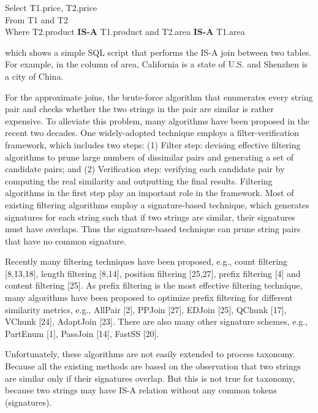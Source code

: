 \vspace{2mm}

\noindent \textsf{Select T1.price, T2.price} \\
\noindent \textsf{ From T1 and T2} \\
\noindent   \textsf{Where T2.product \textbf{IS-A} T1.product and T2.area \textbf{IS-A} T1.area}

 \vspace{2mm}


\noindent which shows a simple SQL script that
performs the IS-A join between two tables. For example, in the column of area, California is a state of U.S. and Shenzhen is a city of China.

For the approximate joins, the brute-force algorithm that enumerates every string pair and checks whether the two strings in the pair are similar is rather expensive. To alleviate this problem, many algorithms have been proposed in the recent two decades. One widely-adopted technique employs a filter-verification framework, which includes two steps: (1) Filter step: devising effective filtering algorithms to prune large numbers of dissimilar pairs and generating a set of candidate pairs; and (2) Verification step: verifying each candidate pair by computing
the real similarity and outputting the final results. Filtering algorithms in the first step play an important role
in the framework. Most of existing filtering algorithms employ a signature-based technique, which generates signatures for each string such that if two strings are similar, their signatures must have overlaps. Thus the signature-based technique can prune string pairs that have no common signature.

Recently many filtering techniques have been proposed, e.g., count filtering [8,13,18], length filtering [8,14], position
filtering [25,27], prefix filtering [4] and content filtering [25]. As prefix filtering is the most effective filtering technique,
many algorithms have been proposed to optimize prefix filtering for different similarity metrics, e.g., AllPair [2],
PPJoin [27], EDJoin [25], QChunk [17], VChunk [24], AdaptJoin [23]. There are also many other signature schemes, e.g., PartEnum [1],
PassJoin [14], FastSS [20].

Unfortunately, these algorithms are not easily extended to process taxonomy. Because all the existing methods are based on the observation that two strings are similar only if their signatures overlap. But this is not true for taxonomy, because two strings may have IS-A relation without any common tokens (signatures).

